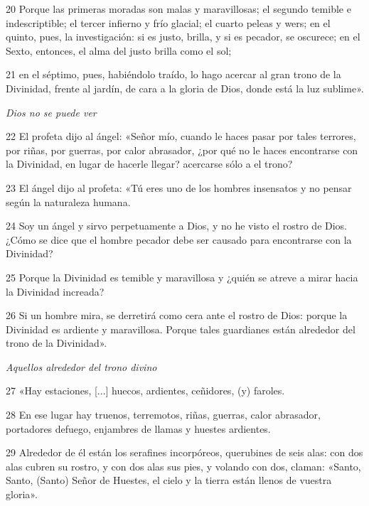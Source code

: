 \par 20 Porque las primeras moradas son malas y maravillosas; el segundo temible e indescriptible; el tercer infierno y frío glacial; el cuarto peleas y wers; en el quinto, pues, la investigación: si es justo, brilla, y si es pecador, se oscurece; en el Sexto, entonces, el alma del justo brilla como el sol;

\par 21 en el séptimo, pues, habiéndolo traído, lo hago acercar al gran trono de la Divinidad, frente al jardín, de cara a la gloria de Dios, donde está la luz sublime».

\par \textit{Dios no se puede ver}

\par 22 El profeta dijo al ángel: «Señor mío, cuando le haces pasar por tales terrores, por riñas, por guerras, por calor abrasador, ¿por qué no le haces encontrarse con la Divinidad, en lugar de hacerle llegar? acercarse sólo a el trono?

\par 23 El ángel dijo al profeta: «Tú eres uno de los hombres insensatos y no pensar según la naturaleza humana.

\par 24 Soy un ángel y sirvo perpetuamente a Dios, y no he visto el rostro de Dios. ¿Cómo se dice que el hombre pecador debe ser causado para encontrarse con la Divinidad?

\par 25 Porque la Divinidad es temible y maravillosa y ¿quién se atreve a mirar hacia la Divinidad increada?

\par 26 Si un hombre mira, se derretirá como cera ante el rostro de Dios: porque la Divinidad es ardiente y maravillosa. Porque tales guardianes están alrededor del trono de la Divinidad».

\par \textit{Aquellos alrededor del trono divino}

\par 27 «Hay estaciones, [...] huecos, ardientes, ceñidores, (y) faroles.

\par 28 En ese lugar hay truenos, terremotos, riñas, guerras, calor abrasador, portadores defuego, enjambres de llamas y huestes ardientes.

\par 29 Alrededor de él están los serafines incorpóreos, querubines de seis alas: con dos alas cubren su rostro, y con dos alas sus pies, y volando con dos, claman: «Santo, Santo, (Santo) Señor de Huestes, el cielo y la tierra están llenos de vuestra gloria».

